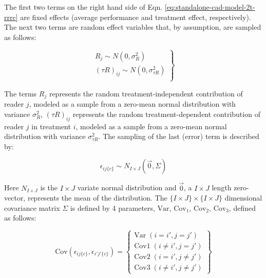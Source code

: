 \documentclass[
]{book}
\begin{document}
The first two terms on the right hand side of Eqn. \eqref{eq:standalone-cad-model-2t-rrrc} are fixed effects (average performance and treatment effect, respectively). The next two terms are random effect variables that, by assumption, are sampled as follows:

\begin{equation}
\left.
\begin{aligned}  
R_j \sim  N\left ( 0,\sigma_R^2 \right )\\
\left ( \tau R \right )_{ij} \sim N\left ( 0,\sigma_{\tau R}^2 \right )\\
\end{aligned}
\right \}
\label{eq:standalone-cad-2t-r-taur-sampling}
\end{equation}

The terms \(R_j\) represents the random treatment-independent contribution of reader \(j\), modeled as a sample from a zero-mean normal distribution with variance \(\sigma_R^2\), \(\left ( \tau R \right )_{ij}\) represents the random treatment-dependent contribution of reader \(j\) in treatment \(i\), modeled as a sample from a zero-mean normal distribution with variance \(\sigma_{\tau R}^2\). The sampling of the last (error) term is described by:

\begin{equation}
\epsilon_{ij\{c\}}\sim N_{I \times J}\left ( \vec{0} , \Sigma \right )
\label{eq:standalone-cad-2t-eps-sampling}
\end{equation}

Here \(N_{I \times J}\) is the \(I \times J\) variate normal distribution and \(\vec{0}\), a \(I \times J\) length zero-vector, represents the mean of the distribution. The \(\{I \times J\} \times \{I \times J\}\) dimensional covariance matrix \(\Sigma\) is defined by 4 parameters, \(\text{Var}\), \(\text{Cov}_1\), \(\text{Cov}_2\), \(\text{Cov}_3\), defined as follows:

\begin{equation}
\text{Cov} \left (\epsilon_{ij\{c\}},\epsilon_{i'j'\{c\}} \right ) =
\left\{\begin{matrix}
\text{Var} \; (i=i',j=j') \\
\text{Cov1} \; (i\ne i',j=j')\\ 
\text{Cov2} \; (i = i',j \ne j')\\ 
\text{Cov3} \; (i\ne i',j \ne j')
\end{matrix}\right\}
\label{eq:standalone-cad-2t-rrrc-cov}
\end{equation}
\end{document}
